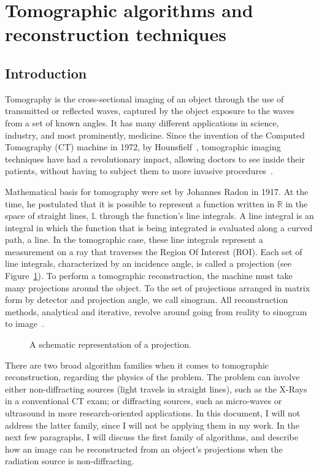 \section{Tomographic algorithms and reconstruction techniques}%
\label{sec:tomographic_algorithms_and_reconstruction_techniques}

\subsection{Introduction}%
\label{sub:introduction}

Tomography is the cross-sectional imaging of an object through the use
of transmitted or reflected waves, captured by the object exposure to
the waves from a set of known angles. It has many different applications
in science, industry, and most prominently, medicine. Since the
invention of the Computed Tomography (\gls{CT}) machine in 1972, by
Hounsfielf~\cite{Gunderman2006}, tomographic imaging techniques have had
a revolutionary impact, allowing doctors to see inside their patients,
without having to subject them to more invasive
procedures~\cite{Kak2001a}.

Mathematical basis for tomography were set by Johannes Radon in 1917. At
the time, he postulated that  it is possible to represent a function
written in $\mathbb{R}$ in the space of straight lines, $\mathbb{L}$
through the function's line integrals. A line integral is an integral in
which the function that is being integrated is evaluated along a curved
path, a line. In the tomographic case, these line integrals represent a
measurement on a ray that traverses the Region Of Interest (\gls{ROI}).
Each set of line integrals, characterized by an incidence angle, is
called a projection (see Figure~\ref{fig:projection}). To perform a
tomographic reconstruction, the machine must take many projections
around the object. To the set of projections arranged in matrix form by
detector and projection angle, we call sinogram. All reconstruction
methods, analytical and iterative, revolve around going from reality to
sinogram to image~\cite{Bruyant2002, Kak2001, Herman1973, Herman1995,
Herman2009, Defrise2003}.

\begin{figure}[htpb]
    \centering
    \caption{A schematic representation of a projection.}
    \label{fig:projection}
\end{figure}

There are two broad algorithm families when it comes to tomographic
reconstruction, regarding the physics of the problem. The problem can
involve either non-diffracting sources (light travels in straight
lines), such as the X-Rays in a conventional \gls{CT} exam; or
diffracting sources, such as micro-waves or ultrasound in more
research-oriented applications. In this document, I will not address the
latter family, since I will not be applying them in my work. In the next
few paragraphs, I will discuss the first family of algorithms, and
describe how an image can be reconstructed from an object's projections
when the radiation source is non-diffracting.

